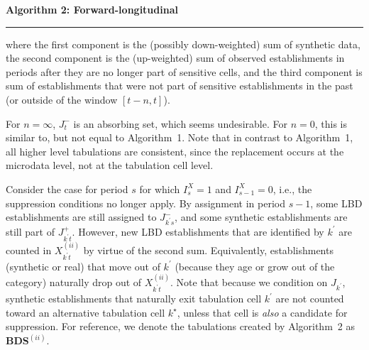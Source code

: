 \begin{algorithm}
{\bf Algorithm 2: Forward-longitudinal}
\hrule
\label{algorithm:2}
\begin{algorithmic}
\EndIf
{}

\end{algorithmic}
\end{algorithm}
%
where the first component is the (possibly down-weighted) sum of synthetic data, the second 
component is the (up-weighted) sum of observed establishments in periods after they are no 
longer part of sensitive cells, and the third component is sum of establishments that were not 
part of sensitive establishments in the past (or outside of the window $[t-n,t]$). 

For $n=\infty$, $J_{t}^-$ is an absorbing set, which seems undesirable. For $n=0$, this is similar 
to, 
but not equal to Algorithm~1. Note that in contrast to Algorithm~1, all higher level tabulations 
are consistent, since the replacement occurs at the microdata level, not at the tabulation cell 
level.

Consider the case for period $s$ for which $I_{s}^X=1$ and $I_{s-1}^X=0$, i.e., the suppression 
conditions no longer apply. By assignment in period $s-1$, some LBD establishments are still 
assigned to $J_{k^\prime s}^-$, and some synthetic establishments are still part of $ J_{k^\prime 
t}^+$. However, new LBD establishments that are identified by $k^\prime$ are counted in 
$X_{k^\prime t}^{(ii)}$ by virtue of the second sum. Equivalently, establishments (synthetic or 
real) that move out of $k^\prime$ (because they age or grow out of the category) naturally drop 
out of $X_{k^\prime t}^{(ii)}$. Note that because we condition on $J_{k^\prime}$, synthetic 
establishments that naturally exit tabulation cell $k^\prime$ are not counted toward an 
alternative tabulation cell $k^\star$, unless that cell is \textit{also} a candidate for suppression. 
For reference, we denote the tabulations created by Algorithm~2 as \textbf{BDS$^{(ii)}$}.


